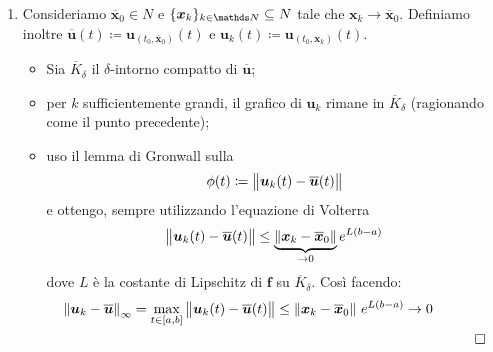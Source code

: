 {\begin{enumerate}
        Dunque, per il lemma di Gronwall, $ \displaystyle \phi(t)\le A_{ \varepsilon}\, e^{L(t-a)}  $. Inoltre, avendo $ \phi(t_{ \varepsilon} ) = \delta $, si ha che \[
            0< \delta \le A_{ \varepsilon} \, e^{L(t_{ \varepsilon} -a)} \longrightarrow 0 
        \]che è assurdo.
        \item Consideriamo $ \overline{\bm{x}}_0 \in N $ e $ \{\bm{x}_{k} \}_{k \in \N} \subseteq N$ tale che $ \bm{x}_k\longrightarrow \overline{\bm{x}}_0 $. Definiamo inoltre $ \overline{\bm{u}}(t)\coloneqq \bm{u}_{(t_0,\overline{\bm{x}}_0)}(t) $ e 
         $ \bm{u}_k (t)\coloneqq \bm{u}_{(t_0,\bm{x}_k)}(t)$.
         \begin{itemize}
            \item Sia $ \overline{K}_{\delta} $ il $ \delta $-intorno compatto di $ \overline{\bm{u}} $;
            \item per $ k $ sufficientemente grandi, il grafico di $ \bm{u}_k $ rimane in $ \overline{K}_{\delta} $ (ragionando come il punto precedente);
            \item uso il lemma di Gronwall sulla \[
                \phi(t)\coloneqq\left\lVert\bm{u}_k(t)-\overline{\bm{u}}(t)\right\rVert
            \]e ottengo, sempre utilizzando l'equazione di Volterra \[
                \left\lVert\bm{u}_k(t)-\overline{\bm{u}}(t)\right\rVert \le \underset{\to 0}{\underbrace{\left\lVert\bm{x}_k-\overline{\bm{x}}_0\right\rVert}}\,e^{L(b-a)}
            \]dove $ L $ è la costante di Lipschitz di $ \bm{f} $ su $ \overline{K}_{\delta}$. Così facendo: 
            \begin{align*}
                \displaystyle \left\lVert\bm{u}_k-\overline{\bm{u}}\right\rVert_{\infty} = \max_{t \in [a,b]} \left\lVert\bm{u}_k(t)-\overline{\bm{u}}(t)\right\rVert\le \left\lVert\bm{x}_k-\overline{\bm{x}}_0\right\rVert\,e^{L(b-a)}\to 0  \\
                &&\qed
            \end{align*}
        \end{itemize}
    \end{enumerate}
}